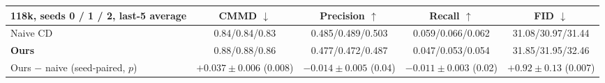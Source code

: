 \begin{tabular}{l c c c c}
\toprule
118k, seeds 0 / 1 / 2, last-5 average & CMMD $\downarrow$ & Precision $\uparrow$ & Recall $\uparrow$ & FID $\downarrow$ \\
\midrule
Naive CD & 0.84/0.84/0.83 & 0.485/0.489/0.503 & 0.059/0.066/0.062 & 31.08/30.97/31.44 \\
\textbf{Ours} & 0.88/0.88/0.86 & 0.477/0.472/0.487 & 0.047/0.053/0.054 & 31.85/31.95/32.46 \\
\midrule
Ours $-$ naive (seed-paired, $p$) & $+0.037\pm0.006$ (0.008) & $-0.014\pm0.005$ (0.04) & $-0.011\pm0.003$ (0.02) & $+0.92\pm0.13$ (0.007) \\
\bottomrule
\end{tabular}